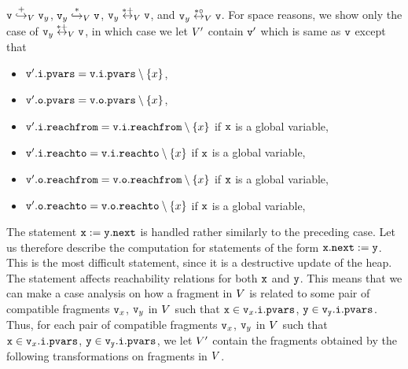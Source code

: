\begin{enumerate}
  $\mathtt{v} \overset{+}\hookrightarrow_{V} \mathtt{v}_y$,
  $\mathtt{v}_y \overset{*}\hookrightarrow_{V} \mathtt{v}$,
  $\mathtt{v}_y \overset{*+}\leftrightarrow_{V} \mathtt{v}$, and
  $\mathtt{v}_y \overset{*\circ}\leftrightarrow_{V} \mathtt{v}$. For space reasons,
  we show only the case of $\mathtt{v}_y \overset{*+}\leftrightarrow_{V} \mathtt{v}$,
  in which case we let $V'$ contain $\mathtt{v}'$ which is same as $\mathtt{v}$ except that
\begin{itemize}
\item $\mathtt{v}'.\mathtt{i}.\mathtt{pvars} = \mathtt{v}.\mathtt{i}.\mathtt{pvars} \setminus \left\{x\right\}$,
\item $\mathtt{v}'.\mathtt{o}.\mathtt{pvars} = \mathtt{v}.\mathtt{o}.\mathtt{pvars} \setminus \left\{x\right\}$,
\item $\mathtt{v}'.\mathtt{i}.\mathtt{reachfrom} = \mathtt{v}.\mathtt{i}.\mathtt{reachfrom} \setminus \left\{x\right\}$ if $\tt x$ is a global variable,
\item $\mathtt{v}'.\mathtt{i}.\mathtt{reachto} = \mathtt{v}.\mathtt{i}.\mathtt{reachto} \setminus \left\{x\right\}$ if $\tt x$ is a global variable,
\item $\mathtt{v}'.\mathtt{o}.\mathtt{reachfrom} = \mathtt{v}.\mathtt{o}.\mathtt{reachfrom} \setminus \left\{x\right\}$ if $\tt x$ is a global variable,
\item $\mathtt{v}'.\mathtt{o}.\mathtt{reachto} = \mathtt{v}.\mathtt{o}.\mathtt{reachto} \setminus \left\{x\right\}$ if $\tt x$ is a global variable,
\end{itemize}
\end{enumerate}
The statement ${\tt x := y.next}$ is handled rather similarly to the preceding
case. Let us therefore describe the computation for statements of the form
${\tt x.next:= y}$.
This is the most difficult statement, since it is a destructive update of the heap. The statement affects reachability relations for both $\mathtt{x}$ and
$\mathtt{y}$. This means that we can make a case analysis on how a fragment
in $V$ is related to some pair of compatible fragments $\mathtt{v}_x$, $\mathtt{v}_y$ in $V$ such that $\mathtt{x} \in \mathtt{v}_x.\mathtt{i}.\mathtt{pvars}$, $\tt y \in \mathtt{v}_y.\mathtt{i}.\mathtt{pvars}$. 
Thus, for each pair of compatible fragments $\mathtt{v}_x$, $\mathtt{v}_y$ in $V$ such that $\mathtt{x} \in \mathtt{v}_x.\mathtt{i}.\mathtt{pvars}$, $\tt y \in \mathtt{v}_y.\mathtt{i}.\mathtt{pvars}$, 
we let $V'$ contain
the fragments obtained by the following transformations on fragments in
$V$.
